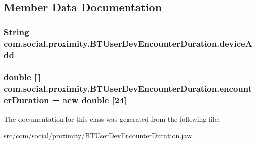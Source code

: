 \subsection{Member Data Documentation}
\hypertarget{classcom_1_1social_1_1proximity_1_1_b_t_user_dev_encounter_duration_a3f0cb0e0e2fde585f9bd82c28e6d0f22}{}
\subsubsection[{device\+Add}]{\setlength{\rightskip}{0pt plus 5cm}String com.\+social.\+proximity.\+B\+T\+User\+Dev\+Encounter\+Duration.\+device\+Add\hspace{0.3cm}{\ttfamily [private]}}\label{classcom_1_1social_1_1proximity_1_1_b_t_user_dev_encounter_duration_a3f0cb0e0e2fde585f9bd82c28e6d0f22}
\hypertarget{classcom_1_1social_1_1proximity_1_1_b_t_user_dev_encounter_duration_ad826a1577bfc1a957ad1c33b5e2542f0}{}
\subsubsection[{encounter\+Duration}]{\setlength{\rightskip}{0pt plus 5cm}double \mbox{[}$\,$\mbox{]} com.\+social.\+proximity.\+B\+T\+User\+Dev\+Encounter\+Duration.\+encounter\+Duration = new double \mbox{[}24\mbox{]}\hspace{0.3cm}{\ttfamily [private]}}\label{classcom_1_1social_1_1proximity_1_1_b_t_user_dev_encounter_duration_ad826a1577bfc1a957ad1c33b5e2542f0}


The documentation for this class was generated from the following file\+:\begin{DoxyCompactItemize}
\item 
src/com/social/proximity/\hyperlink{_b_t_user_dev_encounter_duration_8java}{B\+T\+User\+Dev\+Encounter\+Duration.\+java}\end{DoxyCompactItemize}
